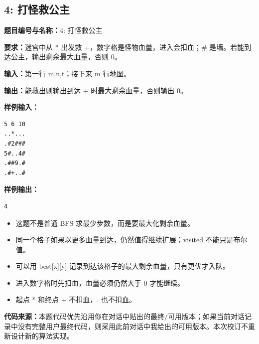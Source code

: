 \documentclass[10pt,a4paper,fontset=none]{ctexart}
\newcommand{\codesource}{\par\noindent\textbf{代码来源：}本题代码优先沿用你在对话中贴出的最终/可用版本；如果当前对话记录中没有完整用户最终代码，则采用此前对话中我给出的可用版本。本次校订不重新设计新的算法实现。\par\vspace{0.2em}}
\begin{document}
\subsection{4: 打怪救公主}
\begin{taskbox}
\textbf{题目编号与名称：}4: 打怪救公主\par
\textbf{要求：}迷宫中从 * 出发救 +，数字格是怪物血量，进入会扣血；\# 是墙。若能到达公主，输出剩余最大血量，否则 0。\par
\textbf{输入：}第一行 m,n,t；接下来 m 行地图。\par
\textbf{输出：}能救出则输出到达 + 时最大剩余血量，否则输出 0。\par
\textbf{样例输入：}
\begin{lstlisting}[style=sample]
5 6 10
..*...
.#2###
5#..4#
.##9.#
.#+..#
\end{lstlisting}
\textbf{样例输出：}
\begin{lstlisting}[style=sample]
4
\end{lstlisting}
\end{taskbox}
\begin{mistakebox}
\begin{itemize}
  \item 这题不是普通 BFS 求最少步数，而是要最大化剩余血量。
  \item 同一个格子如果以更多血量到达，仍然值得继续扩展；visited 不能只是布尔值。
  \item 可以用 best[x][y] 记录到达该格子的最大剩余血量，只有更优才入队。
  \item 进入数字格时先扣血，血量必须仍然大于 0 才能继续。
  \item 起点 * 和终点 + 不扣血，. 也不扣血。
\end{itemize}
\end{mistakebox}
\codesource
\end{document}
